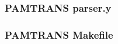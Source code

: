 \documentclass[10.5pt,a4]{article}
\begin{document}
\subsubsection{PAMTRANS parser.y}


\subsubsection{PAMTRANS Makefile}

\lstset{language=modelica}

\begin{comment}
\section{Petrol}

Petrol is a Pascal-like language. The complete implementation is presented below.
\label{listings:petrol}

\subsection{Petrol Abstract.mo}


\subsection{Petrol FCode.mo}


\subsection{Petrol FCEmit.mo}


\subsection{Petrol Flatten.mo}


\subsection{Petrol Static.mo}


\subsection{Petrol TCode.mo}



\end{comment}
\end{document}
